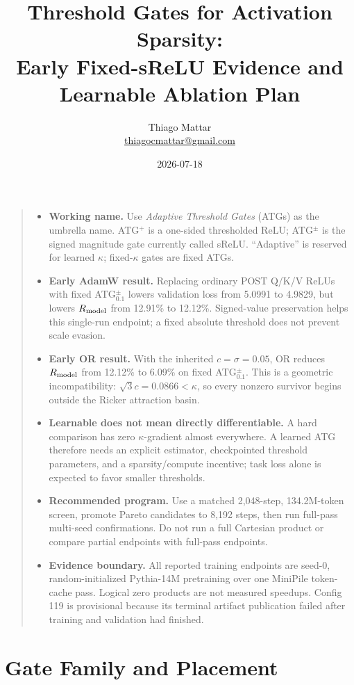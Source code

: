 \documentclass[10pt]{article}
\title{Threshold Gates for Activation Sparsity:\\Early Fixed-sReLU Evidence and Learnable Ablation Plan}
\author{Thiago Mattar\\\href{mailto:thiagocmattar@gmail.com}{thiagocmattar@gmail.com}}
\date{2026-07-18}
\newcommand{\pct}{\%}
\newcommand{\tightsection}[1]{\section{#1}\vspace{-0.35em}}
\newcommand{\Rmodel}{R_{\rm model}}
\begin{document}
\maketitle
\vspace{-1.35em}

\begin{quote}
\begin{itemize}[leftmargin=1.2em]
\item \textbf{Working name.} Use \emph{Adaptive Threshold Gates} (ATGs) as the umbrella name. ATG$^+$ is a one-sided thresholded ReLU; ATG$^{\pm}$ is the signed magnitude gate currently called sReLU. ``Adaptive'' is reserved for learned $\kappa$; fixed-$\kappa$ gates are fixed ATGs.
\item \textbf{Early AdamW result.} Replacing ordinary POST Q/K/V ReLUs with fixed ATG$^{\pm}_{0.1}$ lowers validation loss from 5.0991 to 4.9829, but lowers $\Rmodel$ from 12.91\pct{} to 12.12\pct{}. Signed-value preservation helps this single-run endpoint; a fixed absolute threshold does not prevent scale evasion.
\item \textbf{Early OR result.} With the inherited $c=\sigma=0.05$, OR reduces $\Rmodel$ from 12.12\pct{} to 6.09\pct{} on fixed ATG$^{\pm}_{0.1}$. This is a geometric incompatibility: $\sqrt{3}c=0.0866<\kappa$, so every nonzero survivor begins outside the Ricker attraction basin.
\item \textbf{Learnable does not mean directly differentiable.} A hard comparison has zero $\kappa$-gradient almost everywhere. A learned ATG therefore needs an explicit estimator, checkpointed threshold parameters, and a sparsity/compute incentive; task loss alone is expected to favor smaller thresholds.
\item \textbf{Recommended program.} Use a matched 2,048-step, 134.2M-token screen, promote Pareto candidates to 8,192 steps, then run full-pass multi-seed confirmations. Do not run a full Cartesian product or compare partial endpoints with full-pass endpoints.
\item \textbf{Evidence boundary.} All reported training endpoints are seed-0, random-initialized Pythia-14M pretraining over one MiniPile token-cache pass. Logical zero products are not measured speedups. Config 119 is provisional because its terminal artifact publication failed after training and validation had finished.
\end{itemize}
\end{quote}

\tightsection{Gate Family and Placement}
\end{document}
